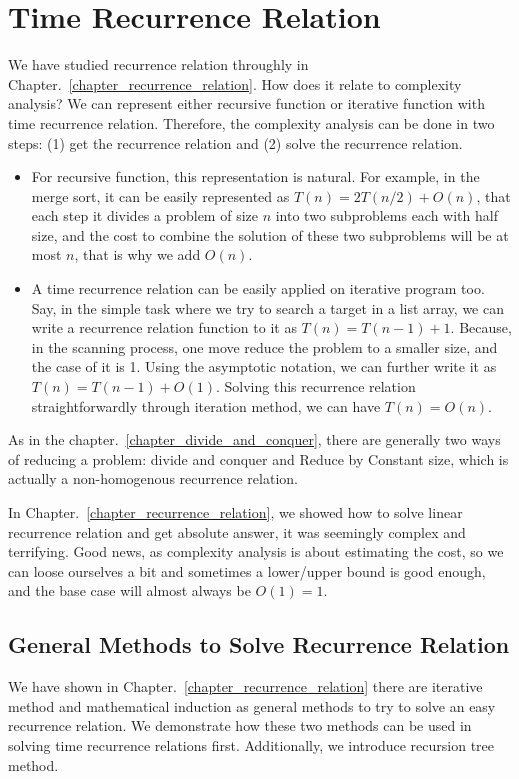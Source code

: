 \documentclass[../main.tex]{subfiles}
\begin{document}
\section{Time Recurrence Relation}
We have studied recurrence relation throughly in Chapter.~\ref{chapter_recurrence_relation}. How does it relate to complexity analysis? We can represent either recursive function or iterative function with time recurrence relation. Therefore, the complexity analysis can be done in two steps: (1) get the recurrence relation and (2) solve the recurrence relation.
\begin{itemize}
    \item For recursive function, this representation is natural. For example, in the merge sort, it can be easily represented as $T(n)=2T(n/2)+O(n)$, that each step it divides a problem of size $n$ into two subproblems each with half size, and the cost to combine the solution of these two subproblems will be at most $n$, that is why we add $O(n)$.
    \item A time recurrence relation can be easily applied on iterative program too. Say, in the simple task where we try to search a target in a list array, we can write a recurrence relation function to it as $T(n)=T(n-1)+1$. Because, in the scanning process, one move reduce the problem to a smaller size, and the case of it is 1. Using the asymptotic notation, we can further write it as $T(n)=T(n-1)+O(1)$. Solving this recurrence relation straightforwardly through iteration method, we can have $T(n)=O(n)$. 
\end{itemize}

As in the chapter.~\ref{chapter_divide_and_conquer}, there are generally two ways of reducing a problem: divide and conquer and Reduce by Constant size, which is actually a non-homogenous recurrence relation. 

 In Chapter.~\ref{chapter_recurrence_relation}, we showed how to solve linear recurrence relation and get absolute answer, it was seemingly complex and terrifying. Good news, as complexity analysis is about estimating the cost, so we can loose ourselves a bit and sometimes a lower/upper bound is good enough, and the base case will almost always be $O(1)=1$. 
 
 \subsection{General Methods to Solve Recurrence Relation}
 We have shown in Chapter.~\ref{chapter_recurrence_relation} there are iterative method and mathematical induction as general methods to try to solve an easy recurrence relation. We demonstrate how these two methods can be used in solving time recurrence relations first. Additionally, we introduce recursion tree method. 
\end{document}
